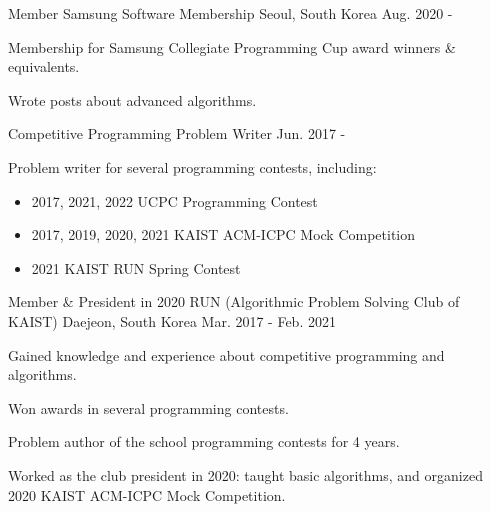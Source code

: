 

\begin{cventries}

\cventry
{Member} %
{Samsung Software Membership} %
{Seoul, South Korea} %
{Aug. 2020 -} %
{
  \begin{cvitems} %
    \item {Membership for Samsung Collegiate Programming Cup award winners \& equivalents.}
    \item {Wrote posts about advanced algorithms.}
  \end{cvitems}
}

  \cventry
    {} %
    {Competitive Programming Problem Writer} %
    {} %
    {Jun. 2017 -} %
    {
      \begin{cvitems} %
        \item {Problem writer for several programming contests, including:
          \begin{itemize}
            \item 2017, 2021, 2022 UCPC Programming Contest
            \item 2017, 2019, 2020, 2021 KAIST ACM-ICPC Mock Competition
            \item 2021 KAIST RUN Spring Contest
          \end{itemize}
        }
      \end{cvitems}
    }


  \cventry
    {Member \& President in 2020} %
    {RUN (Algorithmic Problem Solving Club of KAIST)} %
    {Daejeon, South Korea} %
    {Mar. 2017 - Feb. 2021} %
    {
      \begin{cvitems} %
        \item {Gained knowledge and experience about competitive programming and algorithms.}
        \item {Won awards in several programming contests.}
        \item {Problem author of the school programming contests for 4 years.}
        \item {Worked as the club president in 2020: taught basic algorithms, and organized 2020 KAIST ACM-ICPC Mock Competition.}
      \end{cvitems}
    }

\end{cventries}
